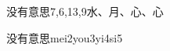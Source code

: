 \begin{entry}{没有意思}{7,6,13,9}{⽔、⽉、⼼、⼼}
  \begin{phonetics}{没有意思}{mei2you3yi4si5}
  \end{phonetics}
\end{entry}
